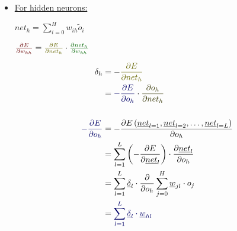 \documentclass[10pt, a4paper]{article}
\begin{document}
\begin{itemize}
\item[]
\underline{For hidden neurons:}

$net_h = \sum_{i=0}^H w_{ih} \tilde{o}_i$

$ \textcolor{red}{\frac{\partial E }{ \partial w_{kh} }} = \textcolor{magenta}{\frac{\partial E }{ \partial net_h }} \cdot \textcolor{green}{\frac{ \partial net_h }{ \partial w_{kh} } }$

\begin{align*}
\delta_h &= - \textcolor{magenta}{\frac{ \partial E }{ \partial net_h}} \\
&= \textcolor{blue}{- \frac{ \partial E }{ \partial o_h}} \cdot \textcolor{orange}{\frac{ \partial o_h }{ \partial net_h}} \\
\\
\textcolor{blue}{- \frac{ \partial E }{ \partial o_h}} &= - \frac{ \partial E \left( \underline{net}_{l=1} , \underline{net}_{l=2} , \hdots , \underline{net}_{l=L} \right) }{ \partial o_h} \\
&= \sum_{l=1}^L \left( - \frac{ \partial E}{ \partial \underline{net}_l } \right) \cdot \frac{ \partial \underline{net}_l }{ \partial o_h} \\
&= \sum_{l=1}^L \underline{\delta}_l \cdot \frac{ \partial }{ \partial o_h} \sum_{j=0}^H \underline{w}_{jl} \cdot o_j \\
&= \textcolor{blue}{\sum_{l=1}^L \underline{\delta}_l \cdot \underline{w}_{hl}}
\end{align*}



\begin{comment}
\item[]
\underline{Kontakt:}
\\
hendriks@cs.uni-bonn.de
\end{comment}

\end{itemize}
\end{document}
